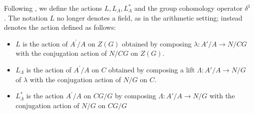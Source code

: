 \documentclass[10pt]{amsart}
\theoremstyle{definition}
\begin{document}
Following \cite[3.2]{DebesDouai97}, we define the actions $L,L_\Lambda,L_\Lambda^*$ and the group cohomology operator $\delta^1$. The notation $L$ no longer denotes a field, as in the arithmetic setting; instead denotes the action defined as follows:
\begin{itemize}
    \item $L$ is the action of $A^\prime/A$ on $Z(G)$ obtained by composing $\lambda\colon A'/A \rightarrow  N/CG$ with the conjugation action of $N/CG$ on $Z(G)$. 
    \item $L_\Lambda$ is the action of $A^\prime/A$ on $C$ obtained by composing a lift $\Lambda\colon A'/A \rightarrow N/G$ of $\lambda$ with the conjugation action of $N/G$ on $C$.
    \item  $L_\Lambda^*$ is the action $A^\prime/A$ on $CG/G$ by composing $\Lambda \colon A'/A \rightarrow N/G$ with the conjugation action of $N/G$ on $CG/G$
\end{itemize}
\end{document}
